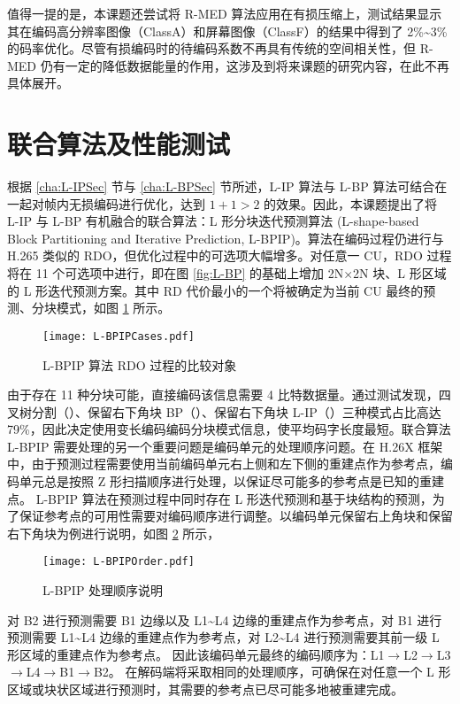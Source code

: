 值得一提的是，本课题还尝试将 R-MED 算法应用在有损压缩上，测试结果显示其在编码高分辨率图像（ClassA）和屏幕图像（ClassF）的结果中得到了 2\%\textasciitilde 3\% 的码率优化。尽管有损编码时的待编码系数不再具有传统的空间相关性，但 R-MED 仍有一定的降低数据能量的作用，这涉及到将来课题的研究内容，在此不再具体展开。

\section{联合算法及性能测试}
根据 \ref{cha:L-IPSec} 节与 \ref{cha:L-BPSec} 节所述，L-IP 算法与 L-BP 算法可结合在一起对帧内无损编码进行优化，达到 $1+1>2$ 的效果。因此，本课题提出了将 L-IP 与 L-BP 有机融合的联合算法：L 形分块迭代预测算法 (L-shape-based Block Partitioning and Iterative Prediction, L-BPIP)。算法在编码过程仍进行与 H.265 类似的 RDO，但优化过程中的可选项大幅增多。对任意一 CU，RDO 过程将在 11 个可选项中进行，即在图 \ref{fig:L-BP} 的基础上增加 2N$\times$2N 块、L 形区域的 L 形迭代预测方案。其中 RD 代价最小的一个将被确定为当前 CU 最终的预测、分块模式，如图 \ref{fig:L-BPIPCases} 所示。
\begin{figure}[hbt]
    \centering
    \texttt{[image: L-BPIPCases.pdf]}
    \caption{L-BPIP 算法 RDO 过程的比较对象}
    \label{fig:L-BPIPCases}
\end{figure}

由于存在 11 种分块可能，直接编码该信息需要 4 比特数据量。通过测试发现，四叉树分割（）、保留右下角块 BP（）、保留右下角块 L-IP（）三种模式占比高达 79\%，因此决定使用变长编码编码分块模式信息，使平均码字长度最短。联合算法 L-BPIP 需要处理的另一个重要问题是编码单元的处理顺序问题。在 H.26X 框架中，由于预测过程需要使用当前编码单元右上侧和左下侧的重建点作为参考点，编码单元总是按照 Z 形扫描顺序进行处理，以保证尽可能多的参考点是已知的重建点。
L-BPIP 算法在预测过程中同时存在 L 形迭代预测和基于块结构的预测，为了保证参考点的可用性需要对编码顺序进行调整。以编码单元保留右上角块和保留右下角块为例进行说明，如图 \ref{fig:L-BPIPOrder} 所示，
\begin{figure}[hbt]
    \centering
    \texttt{[image: L-BPIPOrder.pdf]}
    \caption{L-BPIP 处理顺序说明}
    \label{fig:L-BPIPOrder}
\end{figure}
对 B2 进行预测需要 B1 边缘以及 L1\textasciitilde L4 边缘的重建点作为参考点，对 B1 进行预测需要 L1\textasciitilde L4 边缘的重建点作为参考点，对 L2\textasciitilde L4 进行预测需要其前一级 L 形区域的重建点作为参考点。
因此该编码单元最终的编码顺序为：L1$\to$L2$\to$L3$\to$L4$\to$B1$\to$B2。
在解码端将采取相同的处理顺序，可确保在对任意一个 L 形区域或块状区域进行预测时，其需要的参考点已尽可能多地被重建完成。

